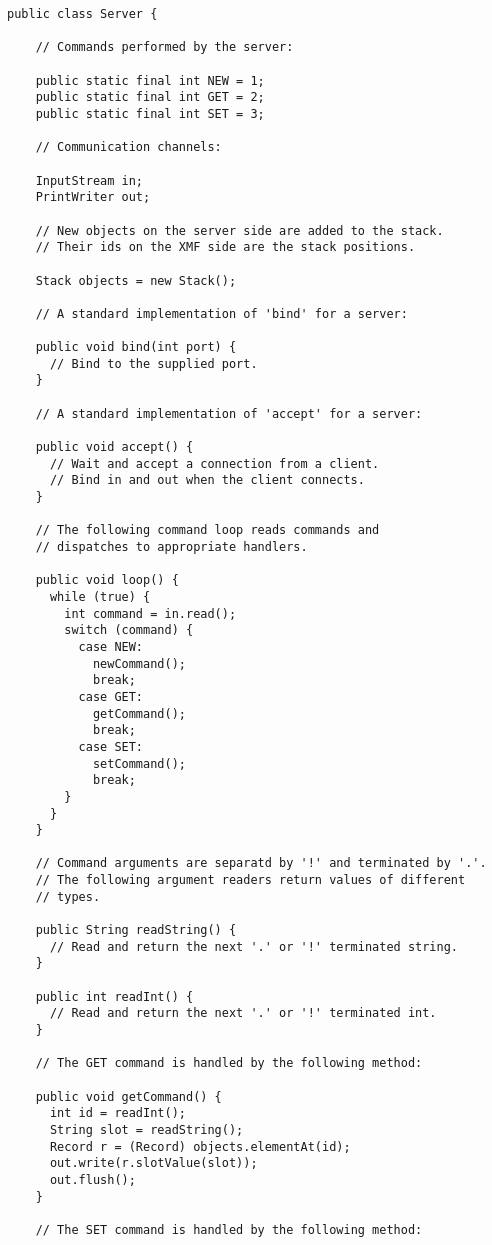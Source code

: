\documentclass{article}
\begin{document}
\begin{verbatim}
public class Server {

    // Commands performed by the server:

    public static final int NEW = 1;
    public static final int GET = 2;
    public static final int SET = 3;
    
    // Communication channels:

    InputStream in;
    PrintWriter out;
    
    // New objects on the server side are added to the stack.
    // Their ids on the XMF side are the stack positions.

    Stack objects = new Stack();
    
    // A standard implementation of 'bind' for a server:

    public void bind(int port) {
      // Bind to the supplied port.
    }
    
    // A standard implementation of 'accept' for a server:

    public void accept() {
      // Wait and accept a connection from a client.
      // Bind in and out when the client connects.
    }
    
    // The following command loop reads commands and
    // dispatches to appropriate handlers.

    public void loop() {
      while (true) {
        int command = in.read();
        switch (command) {
          case NEW:
            newCommand();
            break;
          case GET:
            getCommand();
            break;
          case SET:
            setCommand();
            break;
        }
      }
    }
    
    // Command arguments are separatd by '!' and terminated by '.'.
    // The following argument readers return values of different
    // types.

    public String readString() {
      // Read and return the next '.' or '!' terminated string.
    }
    
    public int readInt() {
      // Read and return the next '.' or '!' terminated int.
    }
    
    // The GET command is handled by the following method:

    public void getCommand() {
      int id = readInt();
      String slot = readString();
      Record r = (Record) objects.elementAt(id);
      out.write(r.slotValue(slot));
      out.flush();
    }
    
    // The SET command is handled by the following method:


\end{verbatim}
\end{document}
